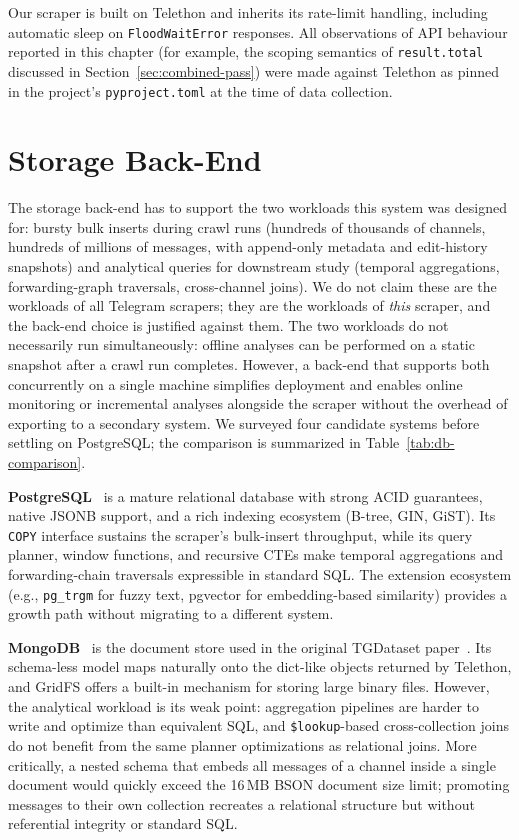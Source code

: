 Our scraper is built on Telethon and inherits its rate-limit handling, including automatic sleep on \texttt{FloodWaitError} responses. All observations of API behaviour reported in this chapter (for example, the scoping semantics of \texttt{result.total} discussed in Section~\ref{sec:combined-pass}) were made against Telethon as pinned in the project's \texttt{pyproject.toml} at the time of data collection.

\section{Storage Back-End}
\label{sec:storage}

The storage back-end has to support the two workloads this system was designed for: bursty bulk inserts during crawl runs (hundreds of thousands of channels, hundreds of millions of messages, with append-only metadata and edit-history snapshots) and analytical queries for downstream study (temporal aggregations, forwarding-graph traversals, cross-channel joins). We do not claim these are the workloads of all Telegram scrapers; they are the workloads of \emph{this} scraper, and the back-end choice is justified against them. The two workloads do not necessarily run simultaneously: offline analyses can be performed on a static snapshot after a crawl run completes. However, a back-end that supports both concurrently on a single machine simplifies deployment and enables online monitoring or incremental analyses alongside the scraper without the overhead of exporting to a secondary system. We surveyed four candidate systems before settling on PostgreSQL; the comparison is summarized in Table~\ref{tab:db-comparison}.

\textbf{PostgreSQL}~\cite{postgresql2026} is a mature relational database with strong ACID guarantees, native JSONB support, and a rich indexing ecosystem (B-tree, GIN, GiST). Its \texttt{COPY} interface sustains the scraper's bulk-insert throughput, while its query planner, window functions, and recursive CTEs make temporal aggregations and forwarding-chain traversals expressible in standard SQL. The extension ecosystem (e.g., \texttt{pg\_trgm} for fuzzy text, pgvector for embedding-based similarity) provides a growth path without migrating to a different system.

\textbf{MongoDB}~\cite{mongodb2026} is the document store used in the original TGDataset paper~\cite{lamorgia2025}. Its schema-less model maps naturally onto the dict-like objects returned by Telethon, and GridFS offers a built-in mechanism for storing large binary files. However, the analytical workload is its weak point: aggregation pipelines are harder to write and optimize than equivalent SQL, and \texttt{\$lookup}-based cross-collection joins do not benefit from the same planner optimizations as relational joins. More critically, a nested schema that embeds all messages of a channel inside a single document would quickly exceed the 16\,MB BSON document size limit; promoting messages to their own collection recreates a relational structure but without referential integrity or standard SQL.

